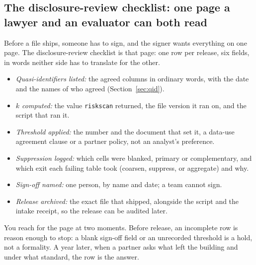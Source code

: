 \subsection{The disclosure-review checklist: one page a lawyer and an evaluator can both read}\label{ch14-sc-checklist}
Before a file ships, someone has to sign, and the signer wants everything on one page. The disclosure-review checklist is that page: one row per release, six fields, in words neither side has to translate for the other.
\begin{itemize}
\item \emph{Quasi-identifiers listed:} the agreed columns in ordinary words, with the date and the names of who agreed (Section~\ref{sec:qid}).
\item \emph{$k$ computed:} the value \texttt{riskscan} returned, the file version it ran on, and the script that ran it.
\item \emph{Threshold applied:} the number and the document that set it, a data-use agreement clause or a partner policy, not an analyst's preference.
\item \emph{Suppression logged:} which cells were blanked, primary or complementary, and which exit each failing table took (coarsen, suppress, or aggregate) and why.
\item \emph{Sign-off named:} one person, by name and date; a team cannot sign.
\item \emph{Release archived:} the exact file that shipped, alongside the script and the intake receipt, so the release can be audited later.
\end{itemize}
You reach for the page at two moments. Before release, an incomplete row is reason enough to stop: a blank sign-off field or an unrecorded threshold is a hold, not a formality. A year later, when a partner asks what left the building and under what standard, the row is the answer.

